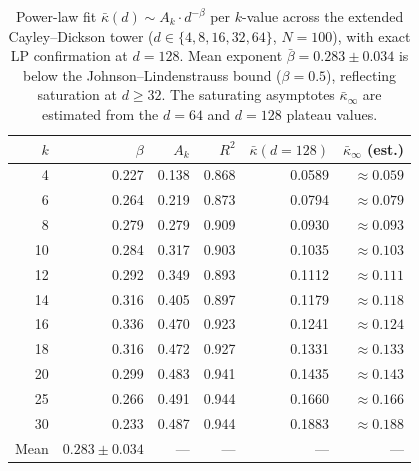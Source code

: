 \documentclass[11pt,a4paper]{article}
\newcommand{\kbar}{\bar{\kappa}}
\begin{document}
\begin{table}[h]
\centering
\caption{Power-law fit $\kbar(d)\sim A_k\cdot d^{-\beta}$ per $k$-value across the extended Cayley--Dickson tower ($d\in\{4,8,16,32,64\}$, $N=100$), with exact LP confirmation at $d=128$. Mean exponent $\bar\beta=0.283\pm0.034$ is below the Johnson--Lindenstrauss bound ($\beta=0.5$), reflecting saturation at $d\geq 32$. The saturating asymptotes $\kbar_\infty$ are estimated from the $d=64$ and $d=128$ plateau values.}
\label{tab:powerlaw}
\small
\begin{tabular}{@{}rrrrrr@{}}
\toprule
$k$ & $\beta$ & $A_k$ & $R^2$ & $\kbar(d{=}128)$ & $\kbar_\infty$ (est.) \\
\midrule
4  & 0.227 & 0.138 & 0.868 & 0.0589 & $\approx 0.059$ \\
6  & 0.264 & 0.219 & 0.873 & 0.0794 & $\approx 0.079$ \\
8  & 0.279 & 0.279 & 0.909 & 0.0930 & $\approx 0.093$ \\
10 & 0.284 & 0.317 & 0.903 & 0.1035 & $\approx 0.103$ \\
12 & 0.292 & 0.349 & 0.893 & 0.1112 & $\approx 0.111$ \\
14 & 0.316 & 0.405 & 0.897 & 0.1179 & $\approx 0.118$ \\
16 & 0.336 & 0.470 & 0.923 & 0.1241 & $\approx 0.124$ \\
18 & 0.316 & 0.472 & 0.927 & 0.1331 & $\approx 0.133$ \\
20 & 0.299 & 0.483 & 0.941 & 0.1435 & $\approx 0.143$ \\
25 & 0.266 & 0.491 & 0.944 & 0.1660 & $\approx 0.166$ \\
30 & 0.233 & 0.487 & 0.944 & 0.1883 & $\approx 0.188$ \\
\midrule
Mean & $0.283\pm0.034$ & --- & --- & --- & --- \\
\bottomrule
\end{tabular}
\end{table}
\end{document}
